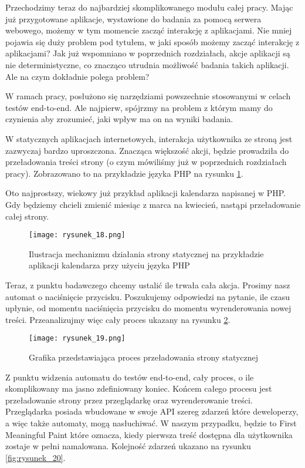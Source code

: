 Przechodzimy teraz do najbardziej skomplikowanego modułu całej pracy.
Mając już przygotowane aplikacje, wystawione do badania za pomocą serwera webowego, możemy w tym momencie zacząć interakcję z aplikacjami.
Nie mniej pojawia się duży problem pod tytułem, w jaki sposób możemy zacząć interakcję z aplikacjami?
Jak już wspomniano w poprzednich rozdziałach, akcje aplikacji są nie deterministyczne, co znacząco utrudnia możliwość badania takich aplikacji.
Ale na czym dokładnie polega problem?

W ramach pracy, posłużono się narzędziami powszechnie stosowanymi w celach testów end-to-end.
Ale najpierw, spójrzmy na problem z którym mamy do czynienia aby zrozumieć, jaki wpływ ma on na wyniki badania.

W statycznych aplikacjach internetowych, interakcja użytkownika ze stroną jest zazwyczaj bardzo uproszczona.
Znacząca większość akcji, będzie prowadziła do przeładowania treści strony (o czym mówiliśmy już w poprzednich rozdziałach pracy).
Zobrazowano to na przykładzie języka PHP na rysunku \ref{fig:rysunek_18}.

Oto najprostszy, wiekowy już przykład aplikacji kalendarza napisanej w PHP. Gdy będziemy chcieli zmienić miesiąc z marca na kwiecień, nastąpi przeładowanie całej strony.

\begin{figure}[htbp]
    \centering
    \texttt{[image: rysunek\_18.png]}
    \caption{Ilustracja mechanizmu działania strony statycznej na przykładzie aplikacji kalendarza przy użyciu języka PHP}
    \label{fig:rysunek_18}
\end{figure}

Teraz, z punktu badawczego chcemy ustalić ile trwała cała akcja. Prosimy nasz automat o naciśnięcie przycisku.
Poszukujemy odpowiedzi na pytanie, ile czasu upłynie, od momentu naciśnięcia przycisku do momentu wyrenderowania nowej treści. Przeanalizujmy więc cały proces ukazany na rysunku \ref{fig:rysunek_19}.

\begin{figure}[htbp]
    \centering
    \texttt{[image: rysunek\_19.png]}
    \caption{Grafika przedstawiająca proces przeładowania strony statycznej}
    \label{fig:rysunek_19}
\end{figure}

Z punktu widzenia automatu do testów end-to-end, cały proces, o ile skomplikowany ma jasno zdefiniowany koniec.
Końcem całego procesu jest przeładowanie strony przez przeglądarkę oraz wyrenderowanie treści.
Przeglądarka posiada wbudowane w swoje API szereg zdarzeń które deweloperzy, a więc także automaty, mogą nasłuchiwać.
W naszym przypadku, będzie to First Meaningful Paint \cite{rail-model} które oznacza, kiedy pierwsza treść dostępna dla użytkownika zostaje w pełni namalowana.
Kolejność zdarzeń ukazano na rysunku \ref{fig:rysunek_20}.

